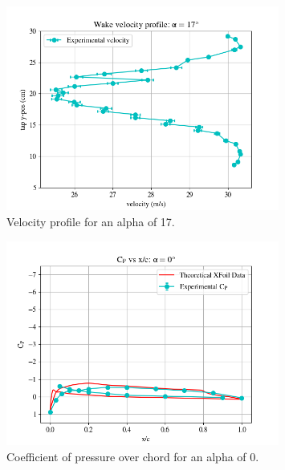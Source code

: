 \documentclass[11pt, letterpaper]{article}
\begin{document}
\begin{appendices}
\begin{figure}[!hpt]
        \centering        
        \includegraphics[width=0.8\textwidth]{Figures/vel-graphs/vel-a17.png}
        \caption{Velocity profile for an alpha of 17\degree.}
        \label{fig:vel-a17}
\end{figure}


\begin{figure}[!hpt]
        \centering        
        \includegraphics[width=0.8\textwidth]{Figures/C_p-a0.png}
        \caption{Coefficient of pressure over chord for an alpha of 0\degree.}
        \label{fig:C_p-a0}
\end{figure}


\end{appendices}
\end{document}

